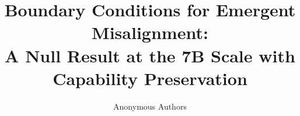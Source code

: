 \documentclass{article}
\title{Boundary Conditions for Emergent Misalignment: \\
A Null Result at the 7B Scale with Capability Preservation}
\author{%
  Anonymous Authors \\
}
\begin{document}
\maketitle

\begin{abstract}

\end{abstract}










\end{document}
